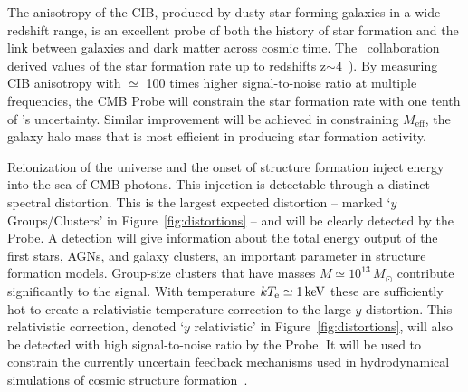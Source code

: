 The anisotropy of the \ac{CIB}, produced by dusty star-forming galaxies in a wide redshift range, is
an excellent probe of both the history of star formation and the link between
galaxies and dark matter across cosmic time. The \planck\ collaboration 
derived values of the star formation rate up to redshifts z$\mathrm{\sim 4}$~\cite{planck2014-XXX,planckXVIII,madau2014}). 
By measuring \ac{CIB} anisotropy with $\simeq$ 100 times higher signal-to-noise ratio at multiple frequencies, the CMB Probe 
will constrain the star formation rate with one tenth of \planck 's uncertainty.  Similar improvement 
will be achieved in constraining $M_{\mathrm{eff}}$, the galaxy halo mass that is most efficient in producing star 
formation activity.


Reionization of the universe and the onset of structure formation inject
energy into the sea of CMB photons. This injection is detectable through a distinct spectral distortion. 
This is the largest expected distortion -- marked `$y$ Groups/Clusters' in Figure~\ref{fig:distortions} --
and will be clearly detected by the Probe. 
A detection will give information about the total energy output of the first stars, AGNs, and galaxy clusters, 
an important parameter in structure formation models. Group-size clusters that have masses $M\simeq 10^{13}\,M_{\odot}$ 
contribute significantly to the signal.  
With temperature $k T_{\rm e}\simeq 1\,{\rm keV}$ these are sufficiently hot to create a relativistic 
temperature correction to the large $y$-distortion. This relativistic correction, denoted `$y$ relativistic' in 
Figure~\ref{fig:distortions},  will also be detected with high signal-to-noise ratio by the Probe. It
will be used to constrain the currently uncertain feedback mechanisms used in hydrodynamical simulations
of cosmic structure formation~\citep{Hill2015}. 

